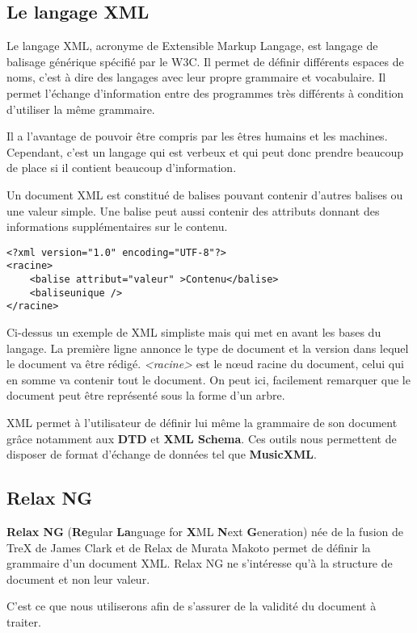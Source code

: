\subsection{Le langage XML}

Le langage XML, acronyme de Extensible Markup Langage, est langage de balisage générique spécifié par le W3C. Il permet de définir différents espaces de noms, c'est à dire des langages avec leur propre grammaire et vocabulaire. Il permet l'échange d'information entre des programmes très différents à condition d'utiliser la même grammaire.

Il a l'avantage de pouvoir être compris par les êtres humains et les machines. Cependant, c'est un langage qui est verbeux et qui peut donc prendre beaucoup de place si il contient beaucoup d'information.

Un document XML est constitué de balises pouvant contenir d'autres balises ou une valeur simple. Une balise peut aussi contenir des attributs donnant des informations supplémentaires sur le contenu.

\begin{lstlisting}[caption=Exemple d'un document XML]
<?xml version="1.0" encoding="UTF-8"?>
<racine>
    <balise attribut="valeur" >Contenu</balise>
    <baliseunique />
</racine>
\end{lstlisting}

\par
Ci-dessus un exemple de XML simpliste mais qui met en avant les bases du langage. La première ligne annonce le type de document et la version dans lequel le document va être rédigé. \emph{<racine>} est le nœud racine du document, celui qui en somme va contenir tout le document. On peut ici, facilement remarquer que le document peut être représenté sous la forme d'un arbre.

\par
XML permet à l'utilisateur de définir lui même la grammaire de son document grâce notamment aux \textbf{DTD} et \textbf{XML Schema}. Ces outils nous permettent de disposer de format d’échange de données tel que \textbf{MusicXML}.


\subsection{Relax NG}
\textbf{Relax NG} (\textbf{Re}gular \textbf{La}nguage for \textbf{X}ML \textbf{N}ext \textbf{G}eneration) née de la fusion de TreX de James Clark et de Relax de Murata Makoto permet de définir la grammaire d'un document XML. Relax NG ne s'intéresse qu'à la structure de document et non leur valeur.
\par C'est ce que nous utiliserons afin de s'assurer de la validité du document à traiter.


